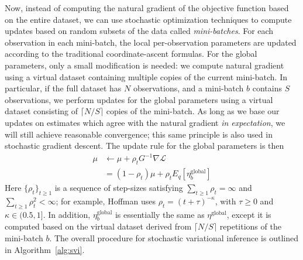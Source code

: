 \documentclass{article}
\begin{document}
Now, instead of computing the natural gradient of the objective function based on the entire dataset, we can use stochastic optimization techniques to compute updates based on random subsets of the data called \emph{mini-batches}.
For each observation in each mini-batch, the local per-observation parameters are updated according to the traditional coordinate-ascent formulas.
For the global parameters, only a small modification is needed: we compute natural gradient using a virtual dataset containing multiple copies of the current mini-batch.
In particular, if the full dataset has $N$ observations, and a mini-batch $b$ contains $S$ observations, we perform updates for the global parameters using a virtual dataset consisting of $\lceil N / S \rceil$ copies of the mini-batch.
As long as we base our updates on estimates which agree with the natural gradient \emph{in expectation}, we will still achieve reasonable convergence;
this same principle is also used in stochastic gradient descent.
The update rule for the global parameters is then
\begin{align}
\mu
&\gets \mu + \rho_t G^{-1} \nabla \mathcal L \\
&= (1-\rho_t) \mu + \rho_t E_q[\eta^{\text{global}}_b]
\end{align}
Here $\{\rho_t\}_{t \geq 1}$ is a sequence of step-sizes satisfying $\sum_{t \geq 1} \rho_t = \infty$ and $\sum_{t \geq 1} \rho_t^2 < \infty$; for example, Hoffman \cite{hoffman2013stochastic} uses $\rho_t = (t + \tau)^{-\kappa}$, with $\tau \geq 0$ and $\kappa \in (0.5, 1]$.
In addition, $\eta^{\text{global}}_b$ is essentially the same as $\eta^{\text{global}}$, except it is computed based on the virtual dataset derived from $\lceil N/S \rceil$ repetitions of the mini-batch $b$.
The overall procedure for stochastic variational inference is outlined in Algorithm~\ref{alg:svi}.

\end{document}
